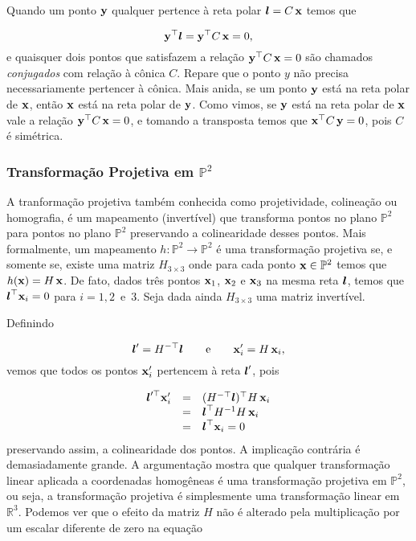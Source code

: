 Quando um ponto ${\bf y}$ qualquer pertence à reta polar $\boldsymbol{l}=C\,\mathbf{x}$ temos que 

\begin{equation*}
{\bf y}^\top\boldsymbol{l}={\bf y}^\top C\,\mathbf{x}=0,
\end{equation*}
e quaisquer dois pontos que satisfazem a relação ${\bf y}^\top C\,\mathbf{x}=0$ são chamados \textit{conjugados} com relação à cônica $C$. Repare que o ponto $y$ não precisa necessariamente pertencer à cônica. Mais anida, se um ponto ${\bf y}$ está na reta polar de $\mathbf{x}$, então $\mathbf{x}$ está na reta polar de ${\bf y}$. Como vimos, se ${\bf y}$ está na reta polar de $\mathbf{x}$ vale a relação ${\bf y}^\top C\,\mathbf{x}=0$, e tomando a transposta temos que $\mathbf{x}^\top C\,{\bf y}=0$, pois $C$ é simétrica. 


\subsubsection{Transformação Projetiva em $\mathbb{P}^2$}\label{sec.trans-proj-H}

A tranformação projetiva também conhecida como projetividade, colineação ou homografia,  é um mapeamento (invertível) que transforma pontos no plano $\mathbb{P}^2$ para pontos no plano $\mathbb{P}^2$ preservando a colinearidade desses pontos. Mais formalmente, um mapeamento $h:\mathbb{P}^2\rightarrow\mathbb{P}^2$ é uma transformação projetiva se, e somente se, existe uma matriz $H_{3\times3}$ onde para cada ponto $\mathbf{x}\in\mathbb{P}^2$ temos que $h(\mathbf{x})=H\,\mathbf{x}$. De fato, dados três pontos $\mathbf{x}_1$, $\mathbf{x}_2$ e $\mathbf{x}_3$ na mesma reta $\boldsymbol{l}$, temos que $\boldsymbol{l}^\top\mathbf{x}_i=0$ para $i=1,2 \,\,\,\text{e}\,\,\, 3$. Seja dada ainda $H_{3\times3}$ uma matriz invertível.

Definindo

\begin{equation*}
\boldsymbol{l}'=H^{-\top}\boldsymbol{l} \qquad\text{e}\qquad \mathbf{x}'_i=H\,\mathbf{x}_i,
\end{equation*}
vemos que todos os pontos $\mathbf{x}'_i$ pertencem à reta $\boldsymbol{l}'$, pois

\begin{equation*}
\begin{array}{rcl}
\boldsymbol{l}'^\top\mathbf{x}'_i&=&(H^{-\top}\boldsymbol{l})^\top H\,\mathbf{x}_i\\
&=&\boldsymbol{l}^\top H^{-1}H\,\mathbf{x}_i\\
&=&\boldsymbol{l}^\top\mathbf{x}_i=0
\end{array}
\end{equation*}
preservando assim, a colinearidade dos pontos. A implicação contrária é demasiadamente grande. A argumentação mostra que qualquer transformação linear aplicada a coordenadas homogêneas é uma transformação projetiva em $\mathbb{P}^2$, ou seja, a transformação projetiva é simplesmente uma transformação linear em $\mathbb{R}^3$. Podemos ver que o efeito da matriz $H$ não é alterado pela multiplicação por um escalar diferente de zero na equação

